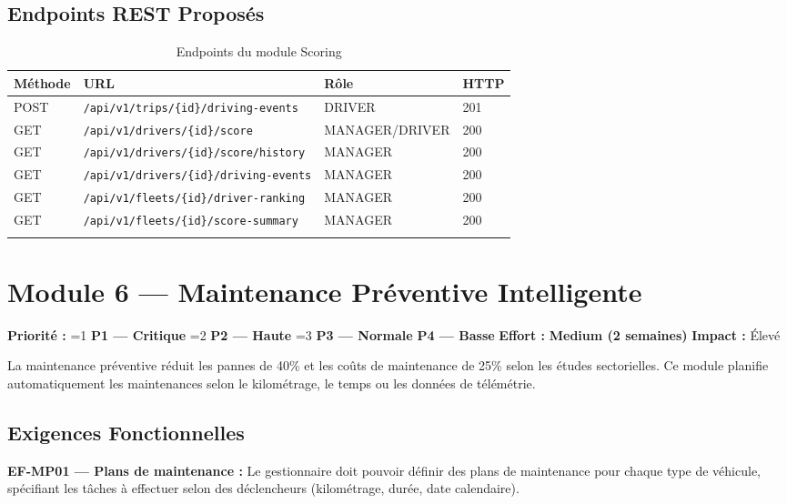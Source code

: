 \documentclass[12pt,a4paper]{report}
\newcommand{\prio}[1]{%
  \ifnum#1=1 \textcolor{fleeterror}{\textbf{P1 — Critique}}%
  \else\ifnum#1=2 \textcolor{fleetwarning}{\textbf{P2 — Haute}}%
  \else\ifnum#1=3 \textcolor{fleetsuccess}{\textbf{P3 — Normale}}%
  \else \textcolor{fleetgray}{\textbf{P4 — Basse}}%
  \fi\fi\fi}
\newcommand{\effort}[1]{\textcolor{fleetpurple}{\textbf{#1}}}
\begin{document}
\section{Endpoints REST Proposés}

\begin{longtable}{p{1.5cm}p{7cm}p{2.5cm}p{1.5cm}}
\toprule
\textbf{Méthode} & \textbf{URL} & \textbf{Rôle} & \textbf{HTTP} \\
\midrule
\endhead
POST & \texttt{/api/v1/trips/\{id\}/driving-events} & DRIVER & 201 \\
GET & \texttt{/api/v1/drivers/\{id\}/score} & MANAGER/DRIVER & 200 \\
GET & \texttt{/api/v1/drivers/\{id\}/score/history} & MANAGER & 200 \\
GET & \texttt{/api/v1/drivers/\{id\}/driving-events} & MANAGER & 200 \\
GET & \texttt{/api/v1/fleets/\{id\}/driver-ranking} & MANAGER & 200 \\
GET & \texttt{/api/v1/fleets/\{id\}/score-summary} & MANAGER & 200 \\
\bottomrule
\caption{Endpoints du module Scoring}
\end{longtable}

\chapter{Module 6 — Maintenance Préventive Intelligente}

\begin{tcolorbox}[colback=fleetcyan!5, colframe=fleetcyan, title={\bfseries Résumé du Module}, fonttitle=\color{white}]
\textbf{Priorité :} \prio{2} \quad \textbf{Effort :} \effort{Medium (2 semaines)} \quad \textbf{Impact :} Élevé

La maintenance préventive réduit les pannes de 40\% et les coûts de maintenance de 25\% selon les études sectorielles. Ce module planifie automatiquement les maintenances selon le kilométrage, le temps ou les données de télémétrie.
\end{tcolorbox}

\section{Exigences Fonctionnelles}

\begin{reqbox}
\textbf{EF-MP01 — Plans de maintenance :} Le gestionnaire doit pouvoir définir des plans de maintenance pour chaque type de véhicule, spécifiant les tâches à effectuer selon des déclencheurs (kilométrage, durée, date calendaire).
\end{reqbox}
\end{document}
